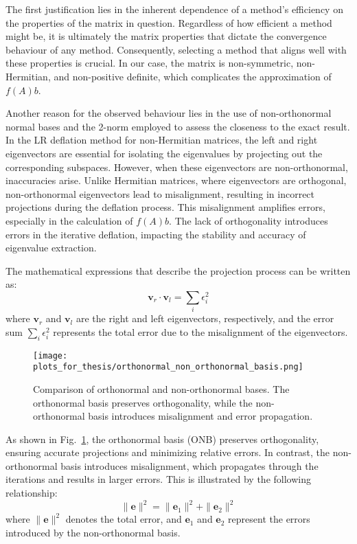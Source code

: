 The first justification lies in the inherent dependence of a method's efficiency on the properties of the matrix in question. Regardless of how efficient a method might be, it is ultimately the matrix properties that dictate the convergence behaviour of any method. Consequently, selecting a method that aligns well with these properties is crucial. In our case, the matrix is non-symmetric, non-Hermitian, and non-positive definite, which complicates the approximation of \(f(A)b\).

Another reason for the observed behaviour lies in the use of non-orthonormal normal bases and the 2-norm employed to assess the closeness to the exact result. In the LR deflation method for non-Hermitian matrices, the left and right eigenvectors are essential for isolating the eigenvalues by projecting out the corresponding subspaces. However, when these eigenvectors are non-orthonormal, inaccuracies arise. Unlike Hermitian matrices, where eigenvectors are orthogonal, non-orthonormal eigenvectors lead to misalignment, resulting in incorrect projections during the deflation process. This misalignment amplifies errors, especially in the calculation of \( f(A) b \). The lack of orthogonality introduces errors in the iterative deflation, impacting the stability and accuracy of eigenvalue extraction.

The mathematical expressions that describe the projection process can be written as:
\[
\mathbf{v}_r \cdot \mathbf{v}_l =  \sum_{i} \epsilon_i^2
\]
where \( \mathbf{v}_r \) and \( \mathbf{v}_l \) are the right and left eigenvectors, respectively, and the error sum \( \sum_i \epsilon_i^2 \) represents the total error due to the misalignment of the eigenvectors.

\begin{figure}[H]
    \centering
    \texttt{[image: plots\_for\_thesis/orthonormal\_non\_orthonormal\_basis.png]}
    \caption{\small Comparison of orthonormal and non-orthonormal bases. The orthonormal basis preserves orthogonality, while the non-orthonormal basis introduces misalignment and error propagation.}
    \label{fig:non_orthonormal_vs_orthonormal}
\end{figure}

As shown in Fig.~\ref{fig:non_orthonormal_vs_orthonormal}, the orthonormal basis (ONB) preserves orthogonality, ensuring accurate projections and minimizing relative errors. In contrast, the non-orthonormal basis introduces misalignment, which propagates through the iterations and results in larger errors. This is illustrated by the following relationship:
\[
\| \mathbf{e} \|^2 = \| \mathbf{e}_1 \|^2 + \| \mathbf{e}_2 \|^2
\]
where \( \| \mathbf{e} \|^2 \) denotes the total error, and \( \mathbf{e}_1 \) and \( \mathbf{e}_2 \) represent the errors introduced by the non-orthonormal basis.

